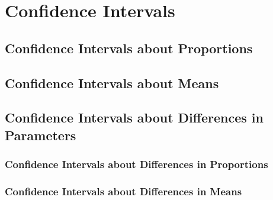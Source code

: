 \documentclass[../AP_Statistics.tex]{subfiles}
\begin{document}
	\chapter{Confidence Intervals}
		\section{Confidence Intervals about Proportions}
		\section{Confidence Intervals about Means}
		\section{Confidence Intervals about Differences in Parameters}
			\subsection{Confidence Intervals about Differences in Proportions}
			\subsection{Confidence Intervals about Differences in Means}
\end{document}
